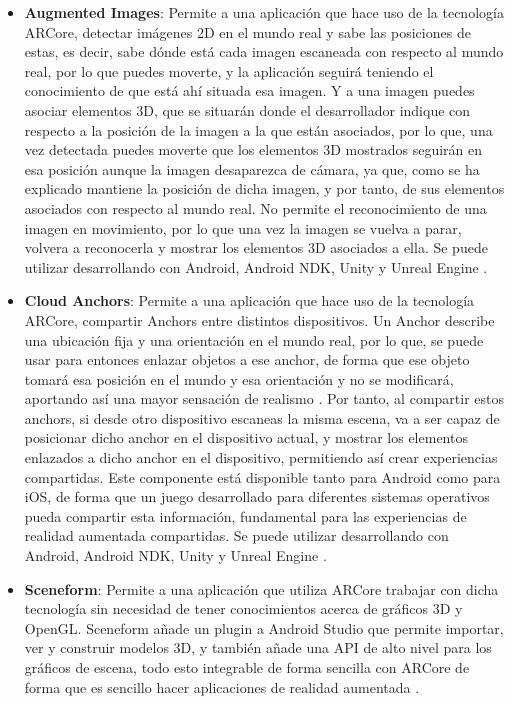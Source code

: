 \begin{itemize}
\begin{itemize}
\begin{itemize}
  \item \textbf{Augmented Images}: Permite a una aplicación que hace uso de la tecnología ARCore, detectar imágenes 2D en el mundo real y sabe las posiciones de estas, es decir, sabe dónde está cada imagen escaneada con respecto al mundo real, por lo que puedes moverte, y la aplicación seguirá teniendo el conocimiento de que está ahí situada esa imagen. Y a una imagen puedes asociar elementos 3D, que se situarán donde el desarrollador indique con respecto a la posición de la imagen a la que están asociados, por lo que, una vez detectada puedes moverte que los elementos 3D mostrados seguirán en esa posición aunque la imagen desaparezca de cámara, ya que, como se ha explicado mantiene la posición de dicha imagen, y por tanto, de sus elementos asociados con respecto al mundo real. No permite el reconocimiento de una imagen en movimiento, por lo que una vez la imagen se vuelva a parar, volvera a reconocerla y mostrar los elementos 3D asociados a ella. Se puede utilizar desarrollando con Android, Android NDK, Unity y Unreal Engine \cite{arcore-augmented-images}.

  \item \textbf{Cloud Anchors}: Permite a una aplicación que hace uso de la tecnología ARCore, compartir Anchors entre distintos dispositivos. Un Anchor describe una ubicación fija y una orientación en el mundo real, por lo que, se puede usar para entonces enlazar objetos a ese anchor, de forma que ese objeto tomará esa posición en el mundo y esa orientación y no se modificará, aportando así una mayor sensación de realismo \cite{arcore-anchors}. Por tanto, al compartir estos anchors, si desde otro dispositivo escaneas la misma escena, va a ser capaz de posicionar dicho anchor en el dispositivo actual, y mostrar los elementos enlazados a dicho anchor en el dispositivo, permitiendo así crear experiencias compartidas. Este componente está disponible tanto para Android como para iOS, de forma que un juego desarrollado para diferentes sistemas operativos pueda compartir esta información, fundamental para las experiencias de realidad aumentada compartidas. Se puede utilizar desarrollando con Android, Android NDK, Unity y Unreal Engine \cite{arcore-cloud-anchors}.

  \item \textbf{Sceneform}: Permite a una aplicación que utiliza ARCore trabajar con dicha tecnología sin necesidad de tener conocimientos acerca de gráficos 3D y OpenGL. Sceneform añade un plugin a Android Studio que permite importar, ver y construir modelos 3D, y también añade una API de alto nivel para los gráficos de escena, todo esto integrable de forma sencilla con ARCore de forma que es sencillo hacer aplicaciones de realidad aumentada \cite{arcore-sceneform}.


\end{itemize}
\end{itemize}
\end{itemize}
